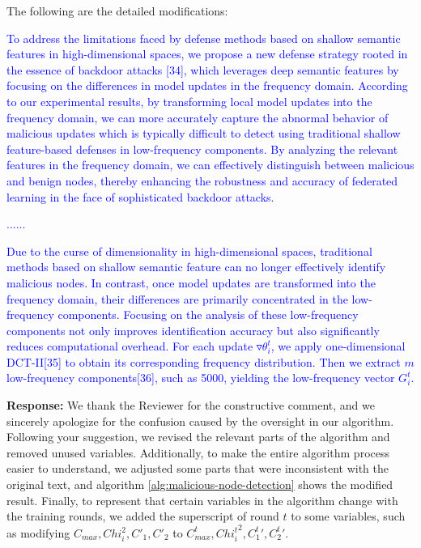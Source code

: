 \documentclass[a4paper,twoside,11pt,dvipsnames]{reviewresponse}
\begin{document}
The following are the detailed modifications:

\textcolor{blue}{
To address the limitations faced by defense methods based on shallow semantic features in high-dimensional spaces, we propose a new defense strategy rooted in the essence of backdoor attacks [34], which leverages deep semantic features by focusing on the differences in model updates in the frequency domain. According to our experimental results, by transforming local model updates into the frequency domain, we can more accurately capture the abnormal behavior of malicious updates which is typically difficult to detect using traditional shallow feature-based defenses in low-frequency components. By analyzing the relevant features in the frequency domain, we can effectively distinguish between malicious and benign nodes, thereby enhancing the robustness and accuracy of federated learning in the face of sophisticated backdoor attacks.
}

\textcolor{blue}{......}

\textcolor{blue}{
Due to the curse of dimensionality in high-dimensional spaces, traditional methods based on shallow semantic
feature can no longer effectively identify malicious nodes. In contrast, once model updates are transformed into the frequency domain, their differences are primarily concentrated in the low-frequency components. Focusing on the analysis of these low-frequency components not only improves identification accuracy but also significantly reduces computational overhead. For each update \(\triangledown \theta_i^t\), we apply one-dimensional DCT-II[35] to obtain its corresponding frequency distribution. Then we extract $m$ low-frequency components[36], such as 5000, yielding the low-frequency vector $G_i^t$.
}







\textbf{Response:} We thank the Reviewer for the constructive comment, and
we sincerely apologize for the confusion caused by the oversight in our algorithm.
Following your suggestion, we revised the relevant parts of the algorithm and removed unused variables.
Additionally, to make the entire algorithm process easier to understand, we adjusted some parts that were inconsistent with the original text, and algorithm \ref{alg:malicious-node-detection} shows the modified result.
Finally, to represent that certain variables in the algorithm change with the training rounds, we added the superscript of round $t$ to some variables, such as modifying $C_{max}, Chi_i^2, {C'_1}, {C'_2}$ to $C^t_{max}, {Chi^t_i}^2, {C^t_1}', {C^t_2}'$.
\end{document}
